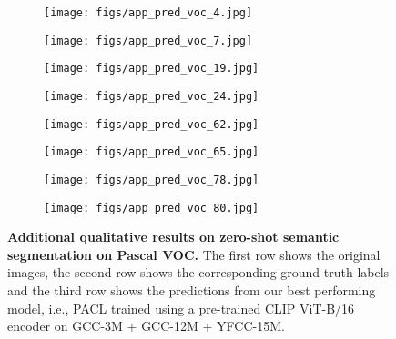 \documentclass[10pt,twocolumn,letterpaper]{article}
\begin{document}
\begin{figure}[!t]
    \begin{subfigure}{0.135\linewidth}
        \centering
        \texttt{[image: figs/app\_pred\_voc\_4.jpg]}
\end{subfigure}
    \begin{subfigure}{0.135\linewidth}
        \centering
        \texttt{[image: figs/app\_pred\_voc\_7.jpg]}
\end{subfigure}
    \begin{subfigure}{0.135\linewidth}
        \centering
        \texttt{[image: figs/app\_pred\_voc\_19.jpg]}
\end{subfigure}
    \begin{subfigure}{0.135\linewidth}
        \centering
        \texttt{[image: figs/app\_pred\_voc\_24.jpg]}
\end{subfigure}
    \begin{subfigure}{0.085\linewidth}
        \centering
        \texttt{[image: figs/app\_pred\_voc\_62.jpg]}
\end{subfigure}
    \begin{subfigure}{0.085\linewidth}
        \centering
        \texttt{[image: figs/app\_pred\_voc\_65.jpg]}
\end{subfigure}
    \begin{subfigure}{0.075\linewidth}
        \centering
        \texttt{[image: figs/app\_pred\_voc\_78.jpg]}
\end{subfigure}
    \begin{subfigure}{0.135\linewidth}
        \centering
        \texttt{[image: figs/app\_pred\_voc\_80.jpg]}
\end{subfigure}

    \caption{\textbf{Additional qualitative results on zero-shot semantic segmentation on Pascal VOC.} The first row shows the original images, the second row shows the corresponding ground-truth labels and the third row shows the predictions from our best performing model, i.e., PACL trained using a pre-trained CLIP ViT-B/16 encoder on GCC-3M + GCC-12M + YFCC-15M.}
    \vspace{-4mm}
    \label{fig:app_segmentation_voc}
\end{figure}
\end{document}
